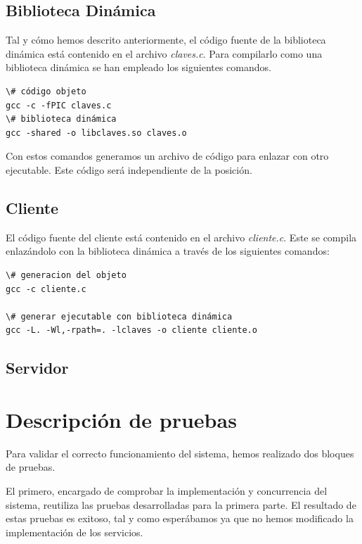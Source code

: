 \documentclass[]{article}
\begin{document}
\subsection{Biblioteca Dinámica}
\label{subsec:biblioteca}
Tal y cómo hemos descrito anteriormente, el código fuente de la biblioteca dinámica está contenido en el archivo \textit{claves.c}. Para compilarlo como una biblioteca dinámica se han empleado los siguientes comandos.

\begin{center}
\begin{lstlisting}[caption=Compiación de biblioteca dinámica]
\# código objeto
gcc -c -fPIC claves.c
\# biblioteca dinámica
gcc -shared -o libclaves.so claves.o
\end{lstlisting}
\end{center}

Con estos comandos generamos un archivo de código para enlazar con otro ejecutable. Este código será independiente de la posición. 

\subsection{Cliente}
\label{subsec:cliente}
El código fuente del cliente está contenido en el archivo \textit{cliente.c}. Este se compila enlazándolo con la biblioteca dinámica a través de los siguientes comandos: 

\begin{center}
\begin{lstlisting}[caption=Compiación de biblioteca dinámica]
\# generacion del objeto
gcc -c cliente.c

\# generar ejecutable con biblioteca dinámica
gcc -L. -Wl,-rpath=. -lclaves -o cliente cliente.o
\end{lstlisting}
\end{center}

\subsection{Servidor}
\label{subsec:servidor}


\section{Descripción de pruebas}
\label{sec:descripcion_de_pruebas}
Para validar el correcto funcionamiento del sistema, hemos realizado dos bloques de pruebas. 

El primero, encargado de comprobar la implementación y concurrencia del sistema, reutiliza las pruebas desarrolladas para la primera parte. El resultado de estas pruebas es exitoso, tal y como esperábamos ya que no hemos modificado la implementación de los servicios.
\end{document}
